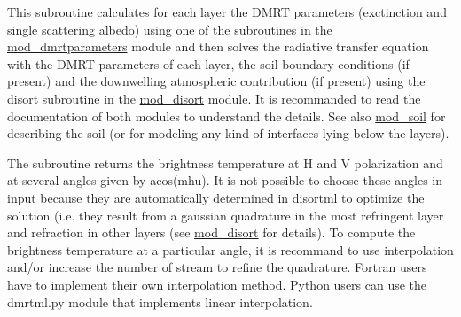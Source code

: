 This subroutine calculates for each layer the DMRT parameters (exctinction and single scattering albedo) using one of the subroutines in the \hyperlink{namespacemod__dmrtparameters}{mod\_\-dmrtparameters} module and then solves the radiative transfer equation with the DMRT parameters of each layer, the soil boundary conditions (if present) and the downwelling atmospheric contribution (if present) using the disort subroutine in the \hyperlink{namespacemod__disort}{mod\_\-disort} module. It is recommanded to read the documentation of both modules to understand the details. See also \hyperlink{namespacemod__soil}{mod\_\-soil} for describing the soil (or for modeling any kind of interfaces lying below the layers).

The subroutine returns the brightness temperature at H and V polarization and at several angles given by acos(mhu). It is not possible to choose these angles in input because they are automatically determined in disortml to optimize the solution (i.e. they result from a gaussian quadrature in the most refringent layer and refraction in other layers (see \hyperlink{namespacemod__disort}{mod\_\-disort} for details). To compute the brightness temperature at a particular angle, it is recommand to use interpolation and/or increase the number of stream to refine the quadrature. Fortran users have to implement their own interpolation method. Python users can use the dmrtml.py module that implements linear interpolation. 